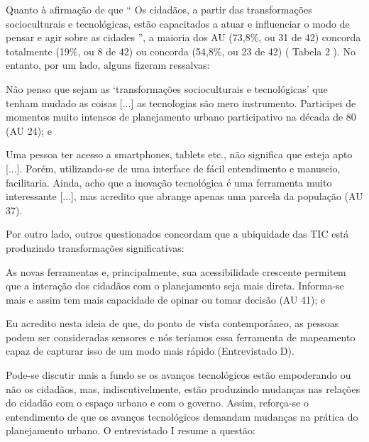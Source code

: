 \documentclass{article}
\begin{document}
Quanto à afirmação de que “%
Os cidadãos, a partir das transformações
						socioculturais e tecnológicas, estão capacitados a atuar e influenciar o
						modo de pensar e agir sobre as cidades%
”, a maioria dos AU (73,8\%,
					ou 31 de 42) concorda totalmente (19\%, ou 8 de 42) ou concorda (54,8\%, ou 23 de
					42) (%
Tabela 2%
). No entanto, por um lado,
					alguns fizeram ressalvas: 

Não penso que sejam as ‘transformações socioculturais e tecnológicas’ que
						tenham mudado as coisas [...] as tecnologias são mero instrumento.
						Participei de momentos muito intensos de planejamento urbano participativo
						na década de 80 %
(AU 24); e%


Uma pessoa ter acesso a smartphones, tablets etc., não significa que esteja
						apto %
[...].%
 Porém, utilizando-se de uma interface de fácil
						entendimento e manuseio, facilitaria. Ainda, acho que a inovação tecnológica
						é uma ferramenta muito interessante %
[...],%
 mas acredito que
						abrange apenas uma parcela da população %
(AU 37).%


Por outro lado, outros questionados concordam que a ubiquidade das TIC está
					produzindo transformações significativas: 

As novas ferramentas e, principalmente, sua acessibilidade crescente permitem
						que a interação dos cidadãos com o planejamento seja mais direta. Informa-se
						mais e assim tem mais capacidade de opinar ou tomar decisão %
(AU 41);
							e%


Eu acredito nesta ideia de que, do ponto de vista contemporâneo, as pessoas
						podem ser consideradas sensores e nós teríamos essa ferramenta de mapeamento
						capaz de capturar isso de um modo mais rápido %
(Entrevistado
							D).%


Pode-se discutir mais a fundo se os avanços tecnológicos estão empoderando ou não
					os cidadãos, mas, indiscutivelmente, estão produzindo mudanças nas relações do
					cidadão com o espaço urbano e com o governo. Assim, reforça-se o entendimento de
					que os avanços tecnológicos demandam mudanças na prática do planejamento urbano.
					O entrevistado I resume a questão: 
\end{document}
